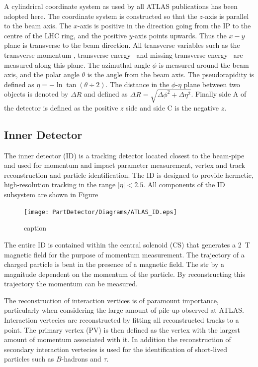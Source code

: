 A cylindrical coordinate system as used by all ATLAS publications has been adopted here. The coordinate system is constructed so that the $z$-axis is parallel to the beam axis. The $x$-axis is positive in the direction going from the IP to the centre of the LHC ring, and the positive $y$-axis points upwards. Thus the $x-y$ plane is transverse to the beam direction. All transverse variables such as the transverse momentum \pt, transverse energy \Et\ and missing transverse energy \met\ are measured along this plane. The azimuthal angle $\phi$ is measured around the beam axis, and the polar angle $\theta$ is the angle from the beam axis. The pseudorapidity is defined as $\eta=-\ln\tan(\theta\div 2)$. The distance in the $\phi$-$\eta$ plane between two objects is denoted by $\Delta R$ and defined as $\Delta R = \sqrt{\Delta\phi^{2} + \Delta\eta^{2}}$. Finally side A of the detector is defined as the positive $z$ side and side C is the negative $z$.

\subsection{Inner Detector}
The inner detector (ID) is a tracking detector located closest to the beam-pipe and used for momentum and impact parameter measurement, vertex and track reconstruction and particle identification. The ID is designed to provide hermetic, high-resolution tracking in the range $|\eta|<2.5$. All components of the ID subsystem are shown in Figure

\begin{figure}[htbp]
  \centering
  \texttt{[image: PartDetector/Diagrams/ATLAS\_ID.eps]}
  \caption{caption}
  \label{fig:DetectorIDOverview}
\end{figure}

The entire ID is contained within the central solenoid (CS) that generates a 2~T magnetic field for the purpose of momentum measurement. The trajectory of a charged particle is bent in the presence of a magnetic field. The str by a magnitude dependent on the momentum of the particle. By reconstructing this trajectory the momentum can be measured. 

The reconstruction of interaction vertices is of paramount importance, particularly when considering the large amount of pile-up observed at ATLAS. Interaction vertecies are reconstructed by fitting all reconstructed tracks to a point. The primary vertex (PV) is then defined as the vertex with the largest amount of momentum associated with it. In addition the reconstruction of secondary interaction vertecies is used for the identification of short-lived particles such as $B$-hadrons and $\tau$.

